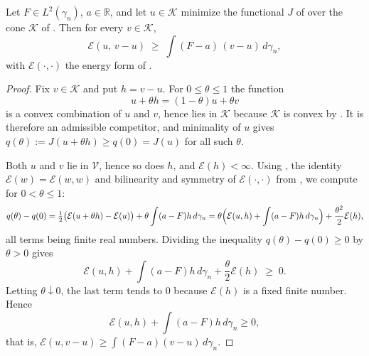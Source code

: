\begin{lemma}
Let $F \in L^2(\gamma_n)$, $a \in \mathbb{R}$, and let $u \in \mathcal{K}$ minimize
the functional $J$ of  over the cone $\mathcal{K}$ of
.  Then for every $v \in \mathcal{K}$,
\[
  \mathcal{E}(u,\, v - u) \;\geq\; \int (F - a)\,(v-u)\, d\gamma_n ,
\]
with $\mathcal{E}(\cdot,\cdot)$ the energy form of .
\end{lemma}
\begin{proof}
Fix $v \in \mathcal{K}$ and put $h = v - u$.  For $0 \leq \theta \leq 1$ the
function
\[
  u + \theta h = (1-\theta)u + \theta v
\]
is a convex combination of $u$ and $v$, hence lies in $\mathcal{K}$ because
$\mathcal{K}$ is convex by .  It is therefore an admissible
competitor, and minimality of $u$ gives
$q(\theta) := J(u+\theta h) \geq q(0) = J(u)$ for all such $\theta$.

Both $u$ and $v$ lie in $\mathcal{V}$, hence so does $h$, and
$\mathcal{E}(h) < \infty$.  Using , the identity
$\mathcal{E}(w) = \mathcal{E}(w,w)$ and bilinearity and symmetry of
$\mathcal{E}(\cdot,\cdot)$ from , we compute for
$0 < \theta \leq 1$:
\[
  q(\theta) - q(0)
    = \tfrac12\bigl(\mathcal{E}(u + \theta h) - \mathcal{E}(u)\bigr)
      + \theta\int (a-F)h\, d\gamma_n
    = \theta\Bigl(\mathcal{E}(u,h) + \int(a-F)h\, d\gamma_n\Bigr)
      + \frac{\theta^2}{2}\mathcal{E}(h),
\]
all terms being finite real numbers.  Dividing the inequality
$q(\theta)-q(0) \geq 0$ by $\theta > 0$ gives
\[
  \mathcal{E}(u,h) + \int(a-F)h \, d\gamma_n + \frac{\theta}{2}\mathcal{E}(h)
    \;\geq\; 0 .
\]
Letting $\theta \downarrow 0$, the last term tends to $0$ because
$\mathcal{E}(h)$ is a fixed finite number.  Hence
\[
  \mathcal{E}(u,h) + \int (a-F)h\, d\gamma_n \geq 0 ,
\]
that is, $\mathcal{E}(u, v-u) \geq \int (F-a)(v-u)\, d\gamma_n$.
\end{proof}
